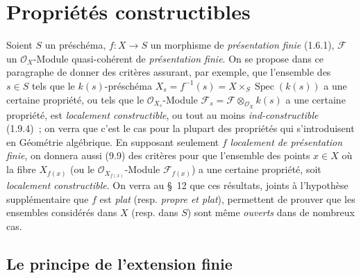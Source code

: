 \section{Propriétés constructibles}
\label{section:IV.9-fr}

Soient $S$ un préschéma, $f:X\to S$ un morphisme de
\emph{présentation finie} (1.6.1), $\mathcal F$ un $\mathcal O_X$-Module
quasi-cohérent de \emph{présentation finie}. On se propose dans ce paragraphe
de donner des critères assurant, par exemple, que l'ensemble des $s\in S$ tels
que le $k(s)$-préschéma
$X_s=f^{-1}(s)=X\times_S\operatorname{Spec}(k(s))$ a une certaine propriété,
ou tels que le $\mathcal O_{X_s}$-Module
$\mathcal F_s=\mathcal F\otimes_{\mathcal O_X}k(s)$ a une certaine propriété,
est \emph{localement constructible}, ou tout au moins
\emph{ind-constructible} (1.9.4)~; on verra que c'est le cas pour la plupart
des propriétés qui s'introduisent en Géométrie algébrique. En supposant
seulement $f$ \emph{localement de présentation finie}, on donnera aussi (9.9)
des critères pour que l'ensemble des points $x\in X$ où la fibre $X_{f(x)}$
(ou le $\mathcal O_{X_{f(x)}}$-Module $\mathcal F_{f(x)}$) a une certaine
propriété, soit \emph{localement constructible}. On verra au \S~12 que ces
résultats, joints à l'hypothèse supplémentaire que $f$ est \emph{plat}
(resp. \emph{propre et plat}), permettent de prouver que les ensembles
considérés dans $X$ (resp. dans $S$) sont même \emph{ouverts} dans de nombreux
cas.

\subsection{Le principe de l'extension finie}
\label{subsection:IV.9.1-fr}

